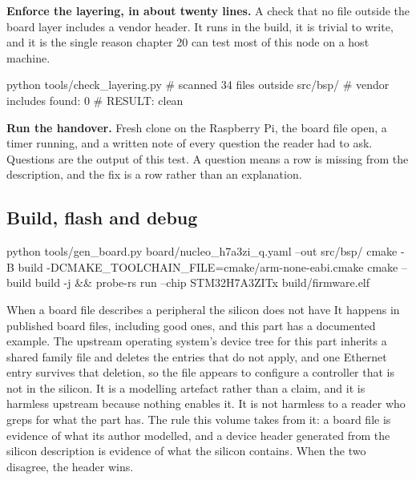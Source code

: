 \begin{steps}
\item \textbf{Enforce the layering, in about twenty lines.} A check that no file
outside the board layer includes a vendor header. It runs in the build, it is
trivial to write, and it is the single reason chapter 20 can test most of this
node on a host machine.
\begin{shellcode}
python tools/check_layering.py
# scanned 34 files outside src/bsp/
# vendor includes found: 0
# RESULT: clean
\end{shellcode}

\item \textbf{Run the handover.} Fresh clone on the Raspberry Pi, the board file
open, a timer running, and a written note of every question the reader had to
ask. Questions are the output of this test. A question means a row is missing
from the description, and the fix is a row rather than an explanation.
\end{steps}

\subsection*{Build, flash and debug}


\begin{shellcode}
python tools/gen_board.py board/nucleo_h7a3zi_q.yaml --out src/bsp/
cmake -B build -DCMAKE_TOOLCHAIN_FILE=cmake/arm-none-eabi.cmake
cmake --build build -j && probe-rs run --chip STM32H7A3ZITx build/firmware.elf
\end{shellcode}

\begin{note}{When a board file describes a peripheral the silicon does not have}
It happens in published board files, including good ones, and this part has a
documented example. The upstream operating system's device tree for this part
inherits a shared family file and deletes the entries that do not apply, and one
Ethernet entry survives that deletion, so the file appears to configure a
controller that is not in the silicon. It is a modelling artefact rather than a
claim, and it is harmless upstream because nothing enables it. It is not
harmless to a reader who greps for what the part has. The rule this volume takes
from it: a board file is evidence of what its author modelled, and a device
header generated from the silicon description is evidence of what the silicon
contains. When the two disagree, the header wins.
\end{note}

